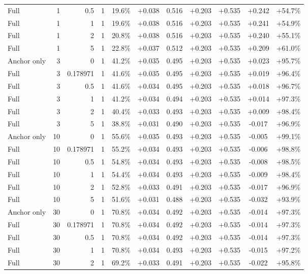 \begin{table}[htbp]
\begin{tabular}{lrrrccccccc}
Full & 1 & 0.5 & 1 & 19.6\% & +0.038 & 0.516 & +0.203 & +0.535 & +0.242 & +54.7\% \\
Full & 1 & 1 & 1 & 19.6\% & +0.038 & 0.516 & +0.203 & +0.535 & +0.241 & +54.9\% \\
Full & 1 & 2 & 1 & 20.8\% & +0.038 & 0.516 & +0.203 & +0.535 & +0.240 & +55.1\% \\
Full & 1 & 5 & 1 & 22.8\% & +0.037 & 0.512 & +0.203 & +0.535 & +0.209 & +61.0\% \\
Anchor only & 3 & 0 & 1 & 41.2\% & +0.035 & 0.495 & +0.203 & +0.535 & +0.023 & +95.7\% \\
Full & 3 & 0.178971 & 1 & 41.6\% & +0.035 & 0.495 & +0.203 & +0.535 & +0.019 & +96.4\% \\
Full & 3 & 0.5 & 1 & 41.6\% & +0.034 & 0.495 & +0.203 & +0.535 & +0.018 & +96.7\% \\
Full & 3 & 1 & 1 & 41.2\% & +0.034 & 0.494 & +0.203 & +0.535 & +0.014 & +97.3\% \\
Full & 3 & 2 & 1 & 40.4\% & +0.033 & 0.493 & +0.203 & +0.535 & +0.009 & +98.4\% \\
Full & 3 & 5 & 1 & 38.8\% & +0.031 & 0.490 & +0.203 & +0.535 & -0.017 & +96.9\% \\
Anchor only & 10 & 0 & 1 & 55.6\% & +0.035 & 0.493 & +0.203 & +0.535 & -0.005 & +99.1\% \\
Full & 10 & 0.178971 & 1 & 55.2\% & +0.034 & 0.493 & +0.203 & +0.535 & -0.006 & +98.8\% \\
Full & 10 & 0.5 & 1 & 54.8\% & +0.034 & 0.493 & +0.203 & +0.535 & -0.008 & +98.5\% \\
Full & 10 & 1 & 1 & 54.4\% & +0.034 & 0.493 & +0.203 & +0.535 & -0.009 & +98.4\% \\
Full & 10 & 2 & 1 & 52.8\% & +0.033 & 0.491 & +0.203 & +0.535 & -0.017 & +96.9\% \\
Full & 10 & 5 & 1 & 51.6\% & +0.031 & 0.488 & +0.203 & +0.535 & -0.032 & +93.9\% \\
Anchor only & 30 & 0 & 1 & 70.8\% & +0.034 & 0.492 & +0.203 & +0.535 & -0.014 & +97.3\% \\
Full & 30 & 0.178971 & 1 & 70.8\% & +0.034 & 0.492 & +0.203 & +0.535 & -0.014 & +97.3\% \\
Full & 30 & 0.5 & 1 & 70.8\% & +0.034 & 0.492 & +0.203 & +0.535 & -0.014 & +97.3\% \\
Full & 30 & 1 & 1 & 70.8\% & +0.034 & 0.493 & +0.203 & +0.535 & -0.015 & +97.2\% \\
Full & 30 & 2 & 1 & 69.2\% & +0.033 & 0.491 & +0.203 & +0.535 & -0.022 & +95.8\% \\

\end{tabular}
\end{table}

